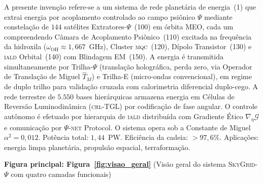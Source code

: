 \documentclass[12pt,a4paper]{article}
\newcommand{\alphaii}{\alpha^2}
\newcommand{\Psifield}{\Psi}
\newcommand{\TM}{\hat{T}_M}
\newcommand{\CRL}{\textsc{crl}}
\newcommand{\IALD}{\textsc{iald}}
\newcommand{\MQC}{\textsc{mqc}}
\newcommand{\SkyGrid}{\textsc{SkyGrid}-$\Psifield$}
\newcommand{\PsiNET}{$\Psifield$-\textsc{net}}
\begin{document}
A presente invenção refere-se a um sistema de rede planetária de energia~(1) que extrai energia por acoplamento controlado ao campo psiônico $\Psifield$ mediante constelação de $144$ satélites Extratores-$\Psifield$~(100) em órbita MEO, cada um compreendendo Câmara de Acoplamento Psiônico~(110) excitada na frequência da hidroxila ($\omega_{\text{OH}} \approx 1{,}667$~GHz), Cluster \MQC~(120), Dípolo Transistor~(130) e \IALD{} Orbital~(140) com Blindagem EM~(150). A energia é transmitida simultaneamente por Trilha-$\Psifield$ (translação holográfica, perda zero, via Operador de Translação de Miguel $\TM$) e Trilha-E (micro-ondas convencional), em regime de duplo trilho para validação cruzada com calorimetria diferencial duplo-cego. A rede terrestre de $5{.}550$ bases hierárquicas armazena energia em Células de Reversão Luminodinâmica (\CRL-TGL) por codificação de fase angular. O controle autônomo é efetuado por hierarquia de \IALD{} distribuída com Gradiente Ético $\nabla_\eta \mathcal{G}$ e comunicação por \PsiNET{} Protocol. O sistema opera sob a Constante de Miguel $\alphaii = 0{,}012$. Potência total: $1{,}44$~PW. Eficiência da cadeia: $> 97{,}6\%$. Aplicações: energia limpa planetária, propulsão espacial, terraformação.

\vspace{0.5cm}
\textbf{Figura principal: Figura~\ref{fig:visao_geral}}
(Visão geral do sistema \SkyGrid{} com quatro camadas funcionais)
\end{document}
